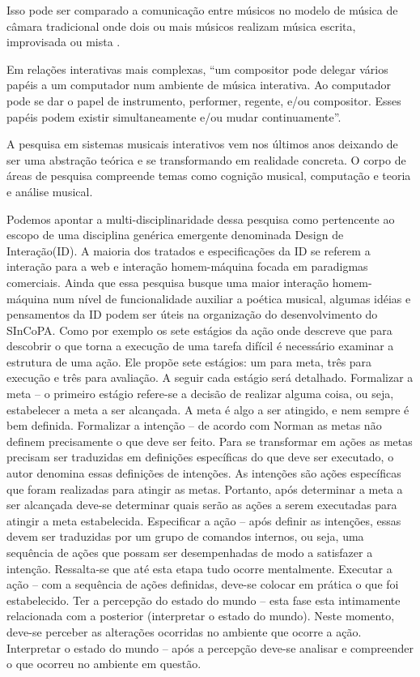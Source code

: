 \documentclass{ppgmus}
\begin{document}
Isso pode ser comparado a comunicação entre músicos no modelo de  música de 
câmara tradicional onde dois ou mais músicos realizam música escrita, improvisada 
ou mista \cite{winkler93:interactive}.

Em relações interativas mais complexas, ``um compositor pode
delegar vários papéis a um computador num ambiente de música interativa. Ao
computador pode se dar o papel de instrumento, performer, regente, e/ou compositor.
Esses papéis podem existir  simultaneamente e/ou mudar continuamente''\cite{lippe:2002}.



A pesquisa em sistemas musicais interativos vem nos últimos anos
deixando de ser uma abstração teórica e se transformando em realidade
concreta. O corpo de áreas de pesquisa compreende temas como cognição
musical, computação e teoria e análise musical.


Podemos apontar a multi-disciplinaridade dessa pesquisa como pertencente 
ao escopo de uma disciplina genérica emergente denominada Design de Interação(ID).
A maioria dos tratados e especificações da ID se referem a interação para a web
e interação homem-máquina focada em paradigmas comerciais. Ainda que essa pesquisa busque
uma maior interação homem-máquina num nível de funcionalidade auxiliar a poética musical, algumas idéias e 
pensamentos da ID podem ser úteis na organização do desenvolvimento do SInCoPA. 
Como por exemplo os sete estágios da ação \cite{norman06:design} onde descreve que para 
descobrir o que torna a
execução de uma tarefa difícil é necessário examinar a
estrutura de uma ação. Ele propõe sete estágios: um para
meta, três para execução e três para avaliação. A seguir cada
estágio será detalhado.
Formalizar a meta – o primeiro estágio refere-se a decisão de
realizar alguma coisa, ou seja, estabelecer a meta a ser
alcançada. A meta é algo a ser atingido, e nem sempre é bem
definida.
Formalizar a intenção – de acordo com Norman as
metas não definem precisamente o que deve ser feito. Para
se transformar em ações as metas precisam ser traduzidas
em definições específicas do que deve ser executado, o autor
denomina essas definições de intenções. As intenções são
ações específicas que foram realizadas para atingir as metas.
Portanto, após determinar a meta a ser alcançada deve-se
determinar quais serão as ações a serem executadas para
atingir a meta estabelecida.
Especificar a ação – após definir as intenções, essas devem
ser traduzidas por um grupo de comandos internos, ou seja,
uma sequência de ações que possam ser desempenhadas de
modo a satisfazer a intenção. Ressalta-se que até esta etapa
tudo ocorre mentalmente.
Executar a ação – com a sequência de ações definidas,
deve-se colocar em prática o que foi estabelecido.
Ter a percepção do estado do mundo – esta fase esta
intimamente relacionada com a posterior (interpretar o estado
do mundo). Neste momento, deve-se perceber as alterações
ocorridas no ambiente que ocorre a ação.
Interpretar o estado do mundo – após a percepção deve-se
analisar e compreender o que ocorreu no ambiente em
questão.
\end{document}
